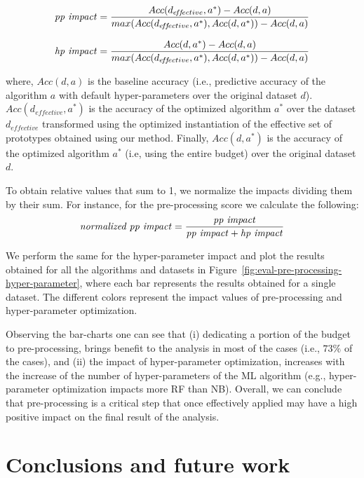 \begin{equation*}
    \text{\textit{pp impact}} = \frac{Acc(d_{e\!f\!f\!ective},a^*) - Acc(d,a)}{max(Acc(d_{e\!f\!f\!ective},a^*),Acc(d,a^*)) - Acc(d,a)}
\end{equation*}

\begin{equation*}
    \text{\textit{hp impact}} = \frac{Acc(d,a^*) - Acc(d,a)}{max(Acc(d_{e\!f\!f\!ective},a^*),Acc(d,a^*)) - Acc(d,a)}
\end{equation*}

where, $Acc(d,a)$ is the baseline accuracy (i.e., predictive accuracy of the algorithm $a$ with default hyper-parameters over the original dataset $d$). $Acc(d_{e\!f\!f\!ective},a^*)$ is the accuracy of the optimized algorithm $a^*$ over the dataset $d_{e\!f\!f\!ective}$ transformed using the optimized instantiation of the effective set of prototypes obtained using our method. Finally,  $Acc(d,a^*)$ is the accuracy of the optimized algorithm $a^*$ (i.e, using the entire budget) over the original dataset $d$.

To obtain relative values that sum to 1, we normalize the impacts dividing them by their sum. For instance, for the pre-processing score we calculate the following:
\begin{equation*}
    \text{\textit{normalized pp impact}} = \frac{\text{\textit{pp impact}}}
    {\text{\textit{pp impact}} + \text{\textit{hp impact}}}
\end{equation*}


We perform the same for the hyper-parameter impact and plot the results obtained for all the algorithms and datasets in Figure~\ref{fig:eval-pre-processing-hyper-parameter}, where each bar represents the results obtained for a single dataset. The different colors represent the impact values of pre-processing and hyper-parameter optimization. 

Observing the bar-charts one can see that (i) dedicating a portion of the budget to pre-processing, brings benefit to the analysis in most of the cases (i.e., $73\%$ of the cases), and (ii) the impact of hyper-parameter optimization, increases with the increase of the number of hyper-parameters of the ML algorithm (e.g., hyper-parameter optimization impacts more RF than NB). Overall, we can conclude that pre-processing is a critical step that once effectively applied may have a high positive impact on the final result of the analysis.

\section{Conclusions and future work}
\label{sec:conclusions}


